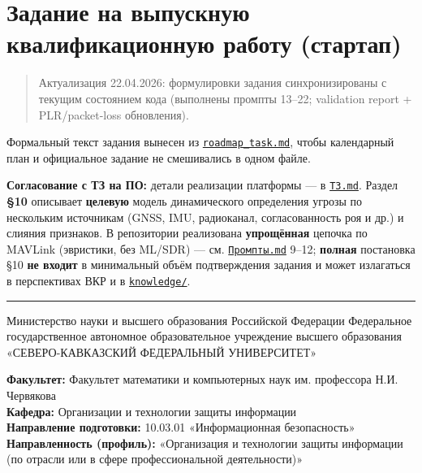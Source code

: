 \hypertarget{ux437ux430ux434ux430ux43dux438ux435-ux43dux430-ux432ux44bux43fux443ux441ux43aux43dux443ux44e-ux43aux432ux430ux43bux438ux444ux438ux43aux430ux446ux438ux43eux43dux43dux443ux44e-ux440ux430ux431ux43eux442ux443-ux441ux442ux430ux440ux442ux430ux43f}{%
\section{Задание на выпускную квалификационную работу (стартап)}\label{ux437ux430ux434ux430ux43dux438ux435-ux43dux430-ux432ux44bux43fux443ux441ux43aux43dux443ux44e-ux43aux432ux430ux43bux438ux444ux438ux43aux430ux446ux438ux43eux43dux43dux443ux44e-ux440ux430ux431ux43eux442ux443-ux441ux442ux430ux440ux442ux430ux43f}}

\begin{quote}
Актуализация 22.04.2026: формулировки задания синхронизированы с текущим состоянием кода (выполнены промпты 13--22; validation report + PLR/packet-loss обновления).
\end{quote}

Формальный текст задания вынесен из \href{roadmap_task.md}{\texttt{roadmap\_task.md}}, чтобы календарный план и официальное задание не смешивались в одном файле.

\textbf{Согласование с ТЗ на ПО:} детали реализации платформы --- в \href{ТЗ.md}{\texttt{ТЗ.md}}. Раздел \textbf{§10} описывает \textbf{целевую} модель динамического определения угрозы по нескольким источникам (GNSS, IMU, радиоканал, согласованность роя и др.) и слияния признаков. В репозитории реализована \textbf{упрощённая} цепочка по MAVLink (эвристики, без ML/SDR) --- см. \href{Промпты.md}{\texttt{Промпты.md}} 9--12; \textbf{полная} постановка §10 \textbf{не входит} в минимальный объём подтверждения задания и может излагаться в перспективах ВКР и в \href{knowledge/}{\texttt{knowledge/}}.

\begin{center}\rule{0.5\linewidth}{0.5pt}\end{center}

Министерство науки и высшего образования Российской Федерации Федеральное государственное автономное образовательное учреждение высшего образования «СЕВЕРО-КАВКАЗСКИЙ ФЕДЕРАЛЬНЫЙ УНИВЕРСИТЕТ»

\textbf{Факультет:} Факультет математики и компьютерных наук им. профессора Н.И. Червякова\\
\textbf{Кафедра:} Организации и технологии защиты информации\\
\textbf{Направление подготовки:} 10.03.01 «Информационная безопасность»\\
\textbf{Направленность (профиль):} «Организация и технологии защиты информации (по отрасли или в сфере профессиональной деятельности)»

